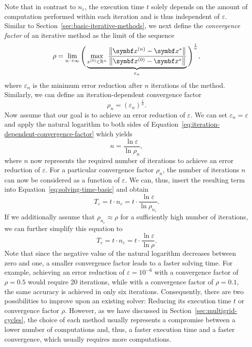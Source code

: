 Note that in contrast to $n_{\varepsilon}$, the execution time $t$ solely depends on the amount of computation performed within each iteration and is thus independent of $\varepsilon$.
Similar to Section~\ref{sec:basic-iterative-methods}, we next define the \emph{convergence factor} of an iterative method as the limit of the sequence
\begin{equation*}
	\rho = \lim \limits_{n \to  \infty} \Bigg( \underbrace{ \max \limits_{x^{(0)} \in \mathbb{R}^{n}} \frac{\norm{\bm{x}^{(n)} - \bm{x}^{*}}}{\norm{\bm{x}^{(0)} - \bm{x}^{*}}} }_{\varepsilon_n} \Bigg)^{\frac{1}{n}},
\end{equation*}
where $\varepsilon_n$  is the minimum error reduction after $n$ iterations of the method.
Similarly, we can define an iteration-dependent convergence factor
\begin{equation}
	\rho_n = \left( \varepsilon_n \right)^{\frac{1}{n}}.
	\label{eq:iteration-dependent-convergence-factor}
\end{equation} 
Now assume that our goal is to achieve an error reduction of $\varepsilon$.
We can set $\varepsilon_n = \varepsilon$ and apply the natural logarithm to both sides of Equation~\eqref{eq:iteration-dependent-convergence-factor} which yields
\begin{equation*}
	n = \frac{\ln \varepsilon}{\ln \rho_n},
\end{equation*} 
where $n$ now represents the required number of iterations to achieve an error reduction of $\varepsilon$.
For a particular convergence factor $\rho_n$, the number of iterations $n$ can now be considered as a function of $\varepsilon$. 
We can, thus, insert the resulting term into Equation~\eqref{eq:solving-time-basic} and obtain
\begin{equation*}
	T_{\varepsilon} = t \cdot n_{\varepsilon} = t \cdot \frac{\ln \varepsilon}{\ln \rho_{n_{\varepsilon}}}.
\end{equation*} 
If we additionally assume that $\rho_{n_{\varepsilon}} \approx \rho$ for a sufficiently high number of iterations, we can further simplify this equation to
\begin{equation}
	T_{\varepsilon} = t \cdot n_{\varepsilon} = t \cdot \frac{\ln \varepsilon}{\ln \rho}.
	\label{eq:solving-time}
\end{equation} 
Note that since the negative value of the natural logarithm decreases between zero and one, a smaller convergence factor leads to a faster solving time.
For example, achieving an error reduction of $\varepsilon = 10^{-6}$ with a convergence factor of $\rho = 0.5$ would require 20 iterations, while with a convergence factor of $\rho = 0.1$, the same accuracy is achieved in only six iterations.
Consequently, there are two possibilities to improve upon an existing solver: Reducing its execution time $t$ or convergence factor $\rho$. 
However, as we have discussed in Section~\ref{sec:multigrid-cycles}, the choice of each method usually represents a compromise between a lower number of computations and, thus, a faster execution time and a faster convergence, which usually requires more computations.

